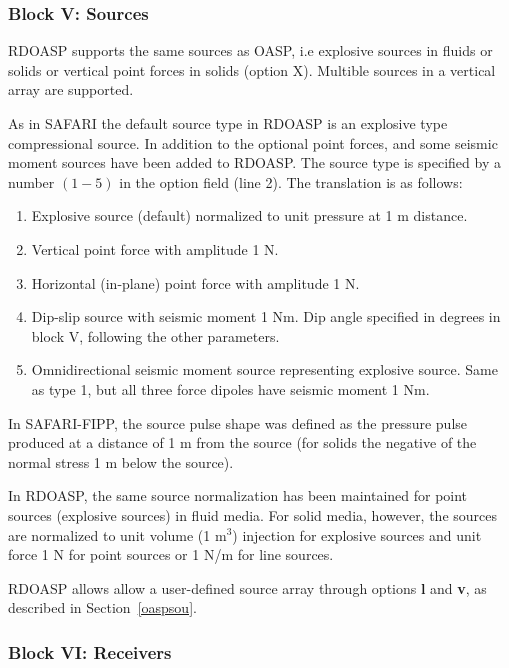 \subsubsection{Block V: Sources}

    RDOASP  supports the same sources as  OASP,  i.e 
explosive sources in fluids or solids or vertical point forces in 
solids  (option  X).  Multible sources in a  vertical  array  are 
supported. 


As in SAFARI the default source type in RDOASP 
is an explosive type compressional source. In addition to the optional
point forces, and some seismic moment sources have been
added to RDOASP. The source type is specified by a number $(1-5)$ in the
option field (line 2). The translation is as follows:
\begin{enumerate}
\item Explosive source (default) normalized to unit pressure at 1 m distance.
\item Vertical point force with amplitude 1 N.
\item Horizontal (in-plane) point force with amplitude 1 N.
\item Dip-slip source with seismic moment 1 Nm. Dip angle specified in 
      degrees in block V, following the other parameters.
\item Omnidirectional seismic moment source representing explosive source. Same as type 1, but all three force dipoles have seismic moment 1 Nm.
\end{enumerate}


    In  SAFARI-FIPP,  the source pulse shape was defined  as  the 
pressure pulse produced at a distance of 1 m from the source (for 
solids the negative of the normal stress 1 m below the source). 

    In  RDOASP, the same source normalization has been  maintained 
for point sources (explosive sources) in fluid media.
    For solid media, however, the sources are normalized to  unit 
volume (1 m$^3$) injection for explosive sources and unit force 
1 N for point sources or 1 N/m for line sources.


RDOASP allows allow a user-defined source
array through options {\bf l} and {\bf v}, as described in Section~\ref{oaspsou}. 

\subsubsection{Block VI: Receivers}

